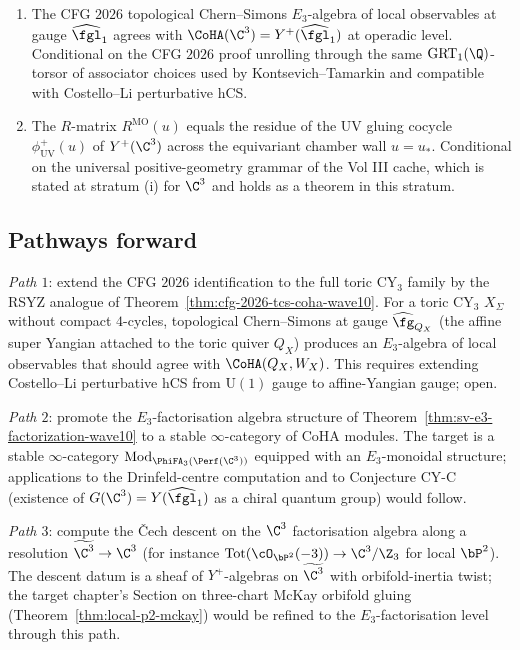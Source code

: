 \begin{proposition}
\begin{enumerate}[label=\textup{(\alph*)}]
  algebra on $\C^3$.
 \item The CFG $2026$ topological Chern--Simons $E_3$-algebra of local
  observables at gauge $\widehat{\fgl}_1$ agrees with $\CoHA(\C^3) =
  Y^+(\widehat{\fgl}_1)$ at operadic level. Conditional on the CFG
  $2026$ proof unrolling through the same $\mathrm{GRT}_1(\Q)$-torsor
  of associator choices used by Kontsevich--Tamarkin and compatible
  with Costello--Li perturbative hCS.
 \item The $R$-matrix $R^{\mathrm{MO}}(u)$ equals the residue of the
  UV gluing cocycle $\phi^+_{\mathrm{UV}}(u)$ of $Y^+(\C^3)$ across
  the equivariant chamber wall $u = u_*$. Conditional on the universal
  positive-geometry grammar of the Vol III cache, which is stated at
  stratum (i) for $\C^3$ and holds as a theorem in this stratum.
\end{enumerate}
\end{proposition}

\subsection*{Pathways forward}

\begin{remark}
\label{rem:three-paths-forward-wave10}
\emph{Path $1$}: extend the CFG $2026$ identification to the full toric
CY$_3$ family by the RSYZ analogue of Theorem~\ref{thm:cfg-2026-tcs-coha-wave10}.
For a toric CY$_3$ $X_\Sigma$ without compact $4$-cycles, topological
Chern--Simons at gauge $\widehat{\fg}_{Q_X}$ (the affine super Yangian
attached to the toric quiver $Q_X$) produces an $E_3$-algebra of local
observables that should agree with $\CoHA(Q_X, W_X)$. This requires
extending Costello--Li perturbative hCS from $\mathrm{U}(1)$ gauge to
affine-Yangian gauge; open.

\emph{Path $2$}: promote the $E_3$-factorisation algebra structure of
Theorem~\ref{thm:sv-e3-factorization-wave10} to a stable $\infty$-category
of CoHA modules. The target is a stable $\infty$-category
$\mathrm{Mod}_{\PhiFA_3(\Perf(\C^3))}$ equipped with an $E_3$-monoidal
structure; applications to the Drinfeld-centre computation and to
Conjecture CY-C (existence of $G(\C^3) = Y(\widehat{\fgl}_1)$ as a
chiral quantum group) would follow.

\emph{Path $3$}: compute the \v{C}ech descent on the $\C^3$ factorisation
algebra along a resolution $\widetilde{\C^3} \to \C^3$ (for instance
$\mathrm{Tot}(\cO_{\bP^2}(-3)) \to \C^3 / \Z_3$ for local $\bP^2$). The
descent datum is a sheaf of $Y^+$-algebras on $\widetilde{\C^3}$ with
orbifold-inertia twist; the target chapter's Section on three-chart
McKay orbifold gluing (Theorem~\ref{thm:local-p2-mckay}) would be
refined to the $E_3$-factorisation level through this path.
\end{remark}

